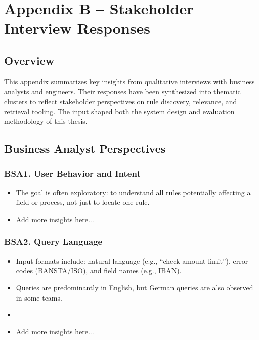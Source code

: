 \chapter{Appendix B – Stakeholder Interview Responses}

\section{Overview}
This appendix summarizes key insights from qualitative interviews with business analysts and engineers. Their responses have been synthesized into thematic clusters to reflect stakeholder perspectives on rule discovery, relevance, and retrieval tooling. The input shaped both the system design and evaluation methodology of this thesis.

\section{Business Analyst Perspectives}

\subsection*{BSA1. User Behavior and Intent}
\begin{itemize}
  \item The goal is often exploratory: to understand all rules potentially affecting a field or process, not just to locate one rule.
  \item Add more insights here...
\end{itemize}

\subsection*{BSA2. Query Language}
\begin{itemize}
  \item Input formats include: natural language (e.g., “check amount limit”), error codes (BANSTA/ISO), and field names (e.g., IBAN).
  \item Queries are predominantly in English, but German queries are also observed in some teams.
  \item \item Add more insights here...
\end{itemize}

